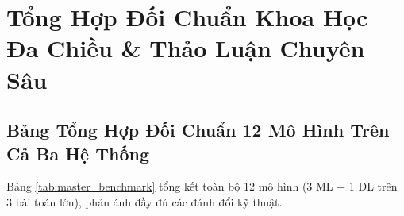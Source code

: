 \documentclass[12pt,a4paper]{report}
\begin{document}
\chapter{Tổng Hợp Đối Chuẩn Khoa Học Đa Chiều \& Thảo Luận Chuyên Sâu}

\section{Bảng Tổng Hợp Đối Chuẩn 12 Mô Hình Trên Cả Ba Hệ Thống}
Bảng \ref{tab:master_benchmark} tổng kết toàn bộ 12 mô hình (3 ML + 1 DL trên 3 bài toán lớn), phản ánh đầy đủ các đánh đổi kỹ thuật.
\end{document}
